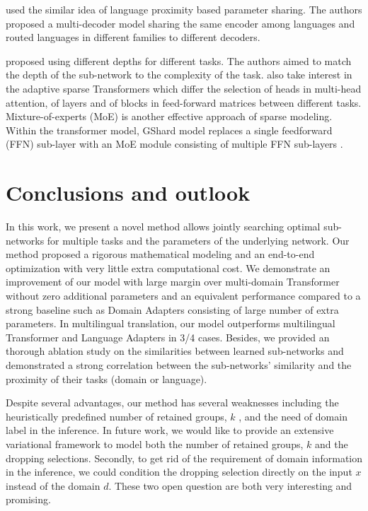 \documentclass[11pt]{article}
\begin{document}
\citep{sen19multilingual,kong21multilingual} used the similar idea of language proximity based parameter sharing. The authors proposed a multi-decoder model sharing the same encoder among languages and routed languages in different families to different decoders.

\citet{xian20deep} proposed using different depths for different tasks. The authors aimed to match the depth of the sub-network to the complexity of the task. \citet{Gong21pay,Gong21adaptive} also take interest in the adaptive sparse Transformers which differ the selection of heads in multi-head attention, of layers and of blocks in feed-forward matrices between different tasks. Mixture-of-experts (MoE) is another effective approach of sparse modeling. Within the transformer model, GShard model replaces a single feedforward (FFN) sub-layer with an MoE module consisting of multiple FFN sub-layers \citep{lepikhin21gshard}. \citet{william21switch}

%

\section{Conclusions and outlook}
In this work, we present a novel method allows jointly searching optimal sub-networks for multiple tasks and the parameters of the underlying network. Our method proposed a rigorous mathematical modeling and an end-to-end optimization with very little extra computational cost. We demonstrate an improvement of our model with large margin over multi-domain Transformer without zero additional parameters and an equivalent performance compared to a strong baseline such as Domain Adapters consisting of large number of extra parameters. In multilingual translation, our model outperforms multilingual Transformer and Language Adapters in 3/4 cases. Besides, we provided an thorough ablation study on the similarities between learned sub-networks and demonstrated a strong correlation between the sub-networks' similarity and the proximity of their tasks (domain or language).

Despite several advantages, our method has several weaknesses including the heuristically predefined number of retained groups, $k$ , and the need of domain label in the inference. In future work, we would like to provide an extensive variational framework to model both the number of retained groups, $k$ and the dropping selections. Secondly, to get rid of the requirement of domain information in the inference, we could condition the dropping selection directly on the input $x$ instead of the domain $d$. These two open question are both very interesting and promising.


\appendix
\end{document}
